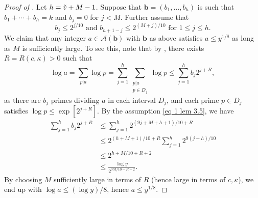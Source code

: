 \documentclass[10pt,a4paper]{amsart}
\begin{document}
\begin{proof}[Proof of ]
	Let $h = \Tilde{v}+M-1$. Suppose that $\bm{b} = (b_1,\dots,b_h)$ is such that $b_1 +\cdots + b_h = k$ and $b_j = 0$ for $j < M$. Further assume that
	\begin{equation}\label{eq 1 lem 3.5}
		b_j \leq 2^{j/10}\text{ and } b_{h+1-j} \leq 2^{(M+j)/10} \text{ for } 1 \leq j \leq h.
	\end{equation}
	We claim that any integer $a \in \mathscr{A}(\bm{b})$ with $\bm{b}$ as above satisfies $a \leq y^{1/8}$ as long as $M$ is sufficiently large. To see this, note that by , there exists $R = R(c,\kappa) > 0$ such that 
	$$\log a = \sum_{p|a} \log p = \sum_{j=1}^h \sum_{\substack{p|a\\ p \in D_j}} \log p \le \sum_{j=1}^h b_j 2^{j+R} ,$$
	as there are $b_j$ primes dividing $a$ in each interval $D_j$, and each prime $p \in D_j$ satisfies $ \log p \leq  \exp[2^{j+R}]$. By the assumption \eqref{eq 1 lem 3.5}, we have 
	\begin{align*}
		\sum_{j=1}^h b_j 2^{j+R} &\leq \sum_{j = 1}^h 2^{(9j+M+h+1)/10+R}\\
		&\leq 2^{(h+M+1)/10 + R} \sum_{j = 1}^h2^{9(j-h)/10}\\
		&\leq 2^{h+M/10+R+2}\\ & \leq \frac{\log y}{2^{9M/10 - R -2}}.
	\end{align*}
	By choosing $M$ sufficiently large in terms of $R$ (hence large in terms of $c,\kappa$), we end up with $\log a \leq (\log y)/8$, hence $a \leq y^{1/8}$. 
	

\end{proof}
\end{document}
